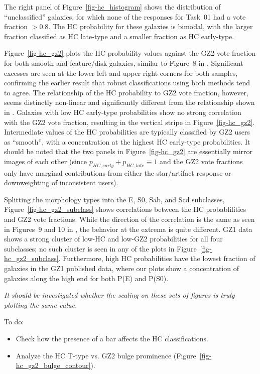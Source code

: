 \documentclass[useAMS,usenatbib]{mn2e}
\begin{document}
The right panel of Figure~\ref{fig-hc_histogram} shows the distribution of ``unclassified'' galaxies, for which none of the responses for Task~01 had a vote fraction $>0.8$. The HC probability for these galaxies is bimodal, with the larger fraction classified as HC late-type and a smaller fraction as HC early-type. 

Figure~\ref{fig-hc_gz2} plots the HC probability values against the GZ2 vote fraction for both smooth and feature/disk galaxies, similar to Figure~8 in \citet{hue11}. Significant excesses are seen at the lower left and upper right corners for both samples, confirming the earlier result that robust classifications using both methods tend to agree. The relationship of the HC probability to GZ2 vote fraction, however, seems distinctly non-linear and significantly different from the relationship shown in \citet{hue11}. Galaxies with low HC early-type probabilities show no strong correlation with the GZ2 vote fraction, resulting in the vertical stripe in Figure~\ref{fig-hc_gz2}. Intermediate values of the HC probabilities are typically classified by GZ2 users as ``smooth'', with a concentration at the highest HC early-type probabilities. It should be noted that the two panels in Figure~\ref{fig-hc_gz2} are essentially mirror images of each other (since $p_{HC,early} + p_{HC,late} \equiv 1$ and the GZ2 vote fractions only have marginal contributions from either the star/artifact response or downweighting of inconsistent users). 

Splitting the morphology types into the E, S0, Sab, and Scd subclasses, Figure~\ref{fig-hc_gz2_subclass} shows correlations between the HC probablilities and GZ2 vote fractions. While the direction of the correlation is the same as seen in Figures~9 and 10 in \citet{hue11}, the behavior at the extrema is quite different. GZ1 data shows a strong cluster of low-HC and low-GZ2 probabilities for all four subclasses; no such cluster is seen in any of the plots in Figure~\ref{fig-hc_gz2_subclass}. Furthermore, high HC probabilities have the lowest fraction of galaxies in the GZ1 published data, where our plots show a concentration of galaxies along the high end for both P(E) and P(S0). 

{\em It should be investigated whether the scaling on these sets of figures is truly plotting the same value. }

To do:
\begin{itemize}
	\item Check how the presence of a bar affects the HC classifications.
	\item Analyze the HC T-type vs. GZ2 bulge prominence (Figure~\ref{fig-hc_gz2_bulge_contour}).
\end{itemize}
\end{document}
